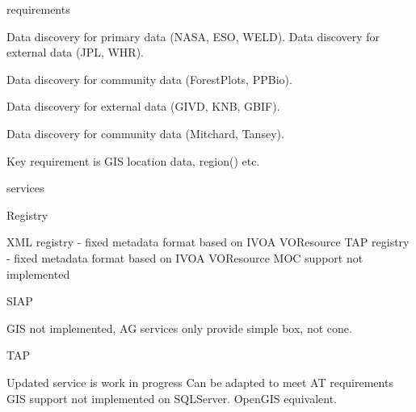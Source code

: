 \documentclass{article}
\begin{document}
\cite{trop} requirements

    Data discovery for primary data (NASA, ESO, WELD).
    Data discovery for external data (JPL, WHR).

    Data discovery for community data (ForestPlots, PPBio).

    Data discovery for external data (GIVD, KNB, GBIF).

    Data discovery for community data (Mitchard, Tansey).

    Key requirement is GIS location data, region() etc.

\cite{astro} services

    Registry

        XML registry - fixed metadata format based on IVOA VOResource
        TAP registry - fixed metadata format based on IVOA VOResource
        MOC support not implemented

    SIAP
    
        GIS not implemented, AG services only provide simple box, not cone.

    TAP
    
        Updated service is work in progress
        Can be adapted to meet AT requirements
        GIS support not implemented on SQLServer.
        OpenGIS equivalent.










%
%

\printbibliography
\end{document}
